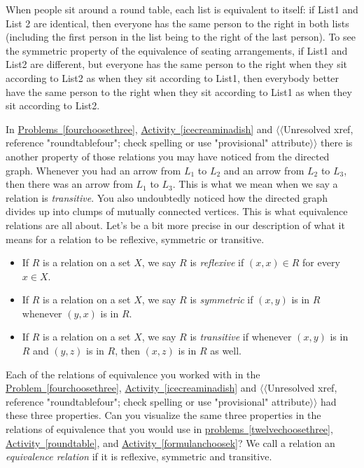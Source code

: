 \documentclass[10pt,]{book}
\theoremstyle{plain}
\theoremstyle{definition}
\numberwithin{equation}{chapter}
\begin{document}
\par
When people sit around a round table, each list is equivalent to itself: if List1 and List 2 are identical, then everyone has the same person to the right in both lists (including the first person in the list being to the right of the last person). To see the symmetric property of the equivalence of seating arrangements, if List1 and List2 are different, but everyone has the same person to the right when they sit according to List2 as when they sit according to List1, then everybody better have the same person to the right when they sit according to List1 as when they sit according to List2.%
\par
In \hyperref[fourchoosethree]{Problems~\ref{fourchoosethree}}, \hyperref[icecreaminadish]{Activity~\ref{icecreaminadish}} and {$\langle\langle$Unresolved xref, reference "roundtablefour"; check spelling or use "provisional" attribute$\rangle\rangle$} there is another property of those relations you may have noticed from the directed graph. Whenever you had an arrow from \(L_1\) to \(L_2\) and an arrow from \(L_2\) to \(L_3\), then there was an arrow from \(L_1\) to \(L_3\). This is what we mean when we say a relation is \emph{transitive}. You also undoubtedly noticed how the directed graph divides up into clumps of mutually connected vertices. This is what equivalence relations are all about. Let's be a bit more precise in our description of what it means for a relation to be reflexive, symmetric or transitive. \leavevmode%
\begin{itemize}[label=\textbullet]
\item{}If \(R\) is a relation on a set \(X\), we say \(R\) is \emph{reflexive}  if \((x,x)\in
R\) for every \(x\in X\).%
\item{}If \(R\) is a relation on a set \(X\), we say \(R\) is \emph{symmetric} if \((x,y)\) is in \(R\) whenever \((y,x)\) is in \(R\).%
\item{}If \(R\) is a relation on a set \(X\), we say \(R\) is \emph{transitive} if whenever \((x,y)\) is in \(R\) and \((y,z)\) is in \(R\), then \((x,z)\) is in \(R\) as well.%
\end{itemize}
%
\par
Each of the relations of equivalence you worked with in the \hyperref[fourchoosethree]{Problem~\ref{fourchoosethree}}, \hyperref[icecreaminadish]{Activity~\ref{icecreaminadish}} and {$\langle\langle$Unresolved xref, reference "roundtablefour"; check spelling or use "provisional" attribute$\rangle\rangle$} had these three properties. Can you visualize the same three properties in the relations of equivalence that you would use in \hyperref[twelvechoosethree]{problems~\ref{twelvechoosethree}}, \hyperref[roundtable]{Activity~\ref{roundtable}}, and \hyperref[formulanchoosek]{Activity~\ref{formulanchoosek}}? We call a relation an \emph{equivalence relation} if it is reflexive, symmetric and transitive.%
\end{document}
